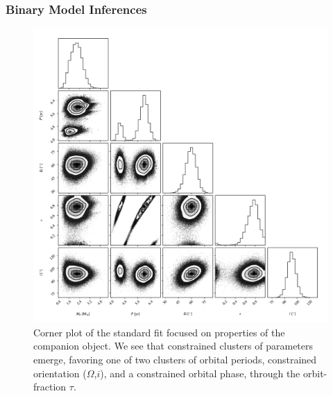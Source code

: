 \documentclass[twocolumn]{aastex631}
\begin{document}
\subsubsection{Binary Model Inferences}


\begin{figure}
    \centering
    \includegraphics[width=\linewidth]{figures/minimal_corner.pdf}
    \caption{Corner plot of the standard fit focused on properties of the companion object. We see that constrained clusters of parameters emerge, favoring one of two clusters of orbital periods, constrained orientation ($\Omega$,$i$), and a constrained orbital phase, through the orbit-fraction $\tau$. }
    \label{fig:minimal-corner}
\end{figure}
\end{document}
